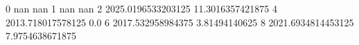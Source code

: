 0 nan nan
1 nan nan
2 2025.0196533203125 11.3016357421875
4 2013.718017578125 0.0
6 2017.532958984375 3.81494140625
8 2021.6934814453125 7.9754638671875
